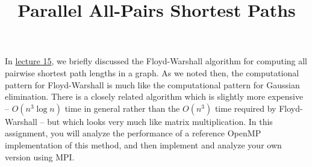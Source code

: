 \documentclass[10pt, leqno]{article} %
\title{Parallel All-Pairs Shortest Paths}
\begin{document}
\pagestyle{fancy}
\fancyfoot{}

\maketitle

In 
\href{http://www.cs.cornell.edu/~bindel/class/cs5220-f11/slides/lec15.pdf}%
{lecture 15}, 
we briefly discussed the Floyd-Warshall algorithm for computing all
pairwise shortest path lengths in a graph.  As we noted then, the
computational pattern for Floyd-Warshall is much like the
computational pattern for Gaussian elimination.  There is a closely
related algorithm which is slightly more expensive -- $O(n^3 \log n)$
time in general rather than the $O(n^3)$ time required by
Floyd-Warshall -- but which looks very much like matrix
multiplication.  In this assignment, you will analyze the performance
of a reference OpenMP implementation of this method, and then
implement and analyze your own version using MPI.


\end{document}
